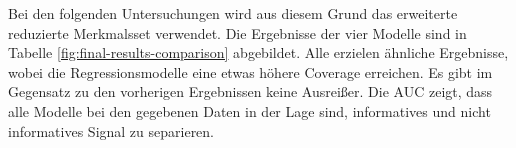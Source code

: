 Bei den folgenden Untersuchungen wird aus diesem Grund das erweiterte reduzierte Merkmalsset verwendet. Die Ergebnisse der vier Modelle sind in Tabelle \ref{fig:final-results-comparison} abgebildet. Alle erzielen ähnliche Ergebnisse, wobei die Regressionsmodelle eine etwas höhere Coverage erreichen. Es gibt im Gegensatz zu den vorherigen Ergebnissen keine Ausreißer. Die \ac{AUC} zeigt, dass alle Modelle bei den gegebenen Daten in der Lage sind, informatives und nicht informatives Signal zu separieren.

